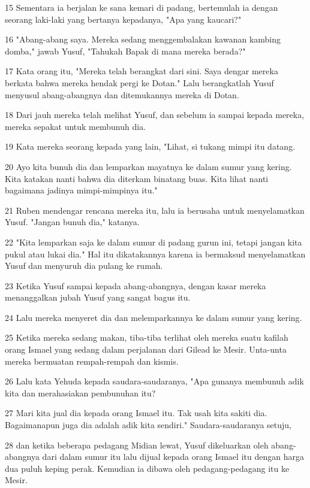 \par 15 Sementara ia berjalan ke sana kemari di padang, bertemulah ia dengan seorang laki-laki yang bertanya kepadanya, "Apa yang kaucari?"
\par 16 "Abang-abang saya. Mereka sedang menggembalakan kawanan kambing domba," jawab Yusuf, "Tahukah Bapak di mana mereka berada?"
\par 17 Kata orang itu, "Mereka telah berangkat dari sini. Saya dengar mereka berkata bahwa mereka hendak pergi ke Dotan." Lalu berangkatlah Yusuf menyusul abang-abangnya dan ditemukannya mereka di Dotan.
\par 18 Dari jauh mereka telah melihat Yusuf, dan sebelum ia sampai kepada mereka, mereka sepakat untuk membunuh dia.
\par 19 Kata mereka seorang kepada yang lain, "Lihat, si tukang mimpi itu datang.
\par 20 Ayo kita bunuh dia dan lemparkan mayatnya ke dalam sumur yang kering. Kita katakan nanti bahwa dia diterkam binatang buas. Kita lihat nanti bagaimana jadinya mimpi-mimpinya itu."
\par 21 Ruben mendengar rencana mereka itu, lalu ia berusaha untuk menyelamatkan Yusuf. "Jangan bunuh dia," katanya.
\par 22 "Kita lemparkan saja ke dalam sumur di padang gurun ini, tetapi jangan kita pukul atau lukai dia." Hal itu dikatakannya karena ia bermaksud menyelamatkan Yusuf dan menyuruh dia pulang ke rumah.
\par 23 Ketika Yusuf sampai kepada abang-abangnya, dengan kasar mereka menanggalkan jubah Yusuf yang sangat bagus itu.
\par 24 Lalu mereka menyeret dia dan melemparkannya ke dalam sumur yang kering.
\par 25 Ketika mereka sedang makan, tiba-tiba terlihat oleh mereka suatu kafilah orang Ismael yang sedang dalam perjalanan dari Gilead ke Mesir. Unta-unta mereka bermuatan rempah-rempah dan kismis.
\par 26 Lalu kata Yehuda kepada saudara-saudaranya, "Apa gunanya membunuh adik kita dan merahasiakan pembunuhan itu?
\par 27 Mari kita jual dia kepada orang Ismael itu. Tak usah kita sakiti dia. Bagaimanapun juga dia adalah adik kita sendiri." Saudara-saudaranya setuju,
\par 28 dan ketika beberapa pedagang Midian lewat, Yusuf dikeluarkan oleh abang-abangnya dari dalam sumur itu lalu dijual kepada orang Ismael itu dengan harga dua puluh keping perak. Kemudian ia dibawa oleh pedagang-pedagang itu ke Mesir.

